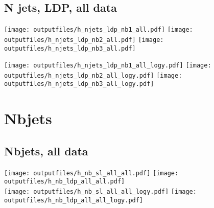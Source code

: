 \documentclass[11pt]{article}
\begin{document}
    \subsection{ N jets, LDP, all data}

    \noindent
     \texttt{[image: outputfiles/h\_njets\_ldp\_nb1\_all.pdf]}
     \texttt{[image: outputfiles/h\_njets\_ldp\_nb2\_all.pdf]}
     \texttt{[image: outputfiles/h\_njets\_ldp\_nb3\_all.pdf]}

    \noindent
     \texttt{[image: outputfiles/h\_njets\_ldp\_nb1\_all\_logy.pdf]}
     \texttt{[image: outputfiles/h\_njets\_ldp\_nb2\_all\_logy.pdf]}
     \texttt{[image: outputfiles/h\_njets\_ldp\_nb3\_all\_logy.pdf]}





    \clearpage
    \section{Nbjets}

    \subsection{ Nbjets, all data}

    \noindent
     \texttt{[image: outputfiles/h\_nb\_sl\_all\_all.pdf]}
     \texttt{[image: outputfiles/h\_nb\_ldp\_all\_all.pdf]} \\
     \texttt{[image: outputfiles/h\_nb\_sl\_all\_all\_logy.pdf]}
     \texttt{[image: outputfiles/h\_nb\_ldp\_all\_all\_logy.pdf]}



\end{document}
